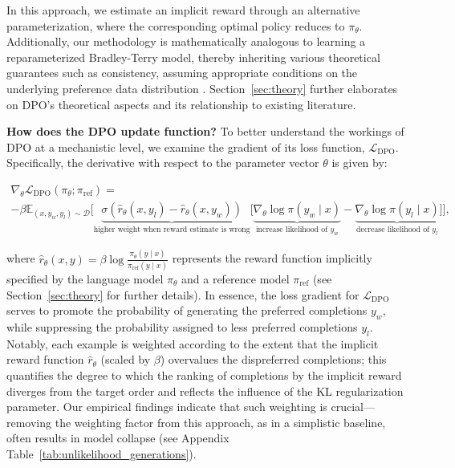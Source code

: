 In this approach, we estimate an implicit reward through an alternative parameterization, where the corresponding optimal policy reduces to $\pi_\theta$. Additionally, our methodology is mathematically analogous to learning a reparameterized Bradley-Terry model, thereby inheriting various theoretical guarantees such as consistency, assuming appropriate conditions on the underlying preference data distribution \cite{bong2022generalized}. Section~\ref{sec:theory} further elaborates on DPO's theoretical aspects and its relationship to existing literature.

\textbf{How does the DPO update function?} To better understand the workings of DPO at a mechanistic level, we examine the gradient of its loss function, $\mathcal{L}_\text{DPO}$. Specifically, the derivative with respect to the parameter vector $\theta$ is given by:

\begin{multline*}\label{eq:gradient}
    \nabla_\theta \mathcal{L}_\text{DPO}(\pi_\theta;\pi_\text{ref}) = \\ -\beta\mathbb{E}_{(x, y_w, y_l) \sim \mathcal{D}} \bigg[\underbrace{\sigma(\hat{r}_\theta(x, y_l) - \hat{r}_\theta (x, y_w))}_\text{higher weight when reward estimate is wrong}\bigg[\underbrace{\nabla_\theta\log \pi(y_w \mid x)}_\text{increase likelihood of $y_w$} - \underbrace{\nabla_\theta\log\pi(y_l \mid x)}_\text{decrease likelihood of $y_l$}\bigg]\bigg],
\end{multline*}

where $\hat{r}_\theta(x, y) = \beta \log \frac{\pi_\theta(y \mid x)}{\pi_\text{ref}(y \mid x)}$ represents the reward function implicitly specified by the language model $\pi_\theta$ and a reference model $\pi_\text{ref}$ (see Section~\ref{sec:theory} for further details). In essence, the loss gradient for $\mathcal{L}_\text{DPO}$ serves to promote the probability of generating the preferred completions $y_w$, while suppressing the probability assigned to less preferred completions $y_l$. Notably, each example is weighted according to the extent that the implicit reward function $\hat{r}_\theta$ (scaled by $\beta$) overvalues the dispreferred completions; this quantifies the degree to which the ranking of completions by the implicit reward diverges from the target order and reflects the influence of the KL regularization parameter. Our empirical findings indicate that such weighting is crucial—removing the weighting factor from this approach, as in a simplistic baseline, often results in model collapse (see Appendix Table~\ref{tab:unlikelihood_generations}).

